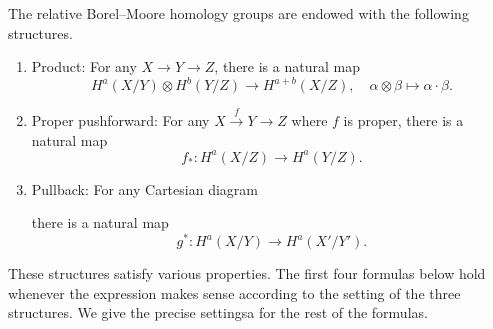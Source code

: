 \documentclass[10pt]{amsart}
\newcommand{\+}{{}^+}
\theoremstyle{definition}
\theoremstyle {definition}
\theoremstyle {definition}
\begin{document}
The relative Borel--Moore homology groups are endowed with the following structures.
\begin{enumerate}
    \item [(i)] Product: For any $X\rightarrow Y\rightarrow Z$, there is a natural map
    $$H^{a}(X/Y)\otimes H^{b}(Y/Z)\rightarrow H^{a+b}(X/Z),\quad \alpha\otimes\beta\mapsto \alpha\cdot \beta.$$
    \item [(ii)] Proper pushforward: For any $X\xrightarrow{f}Y\rightarrow Z$ where $f$ is proper, there is a natural map 
    $$f_*:H^{a}(X/Z)\rightarrow H^a(Y/Z).$$
    \item [(iii)] Pullback: For any Cartesian diagram
    \begin{center}
    \end{center}
    there is a natural map
    $$g^*:H^{a}(X/Y)\rightarrow H^{a}(X'/Y').
    $$
\end{enumerate}
These structures satisfy various properties. The first four formulas below hold whenever the expression makes sense according to the setting of the three structures. We give the precise settingsa for the rest of the formulas.
\end{document}
